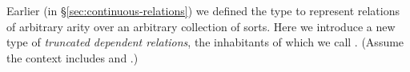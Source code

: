 Earlier (in \S\ref{sec:continuous-relations}) we defined the  type to represent relations of arbitrary arity over an arbitrary collection of sorts. Here we introduce a new type of \emph{truncated dependent relations}, the inhabitants of which we call . (Assume the context includes \AgdaSpace{}%
\AgdaSymbol{:}\AgdaSpace{}%
 and \AgdaSpace{}%
\AgdaSymbol{:}\AgdaSpace{}%
\AgdaSpace{}%
.)
\ccpad
\begin{code}%
\>[0][@{}l@{\AgdaIndent{1}}]%
\>[1]\AgdaSpace{}%
\AgdaSymbol{:}\AgdaSpace{}%
\AgdaSymbol{\{}\AgdaSpace{}%
\AgdaSymbol{:}\AgdaSpace{}%
\AgdaSpace{}%
\AgdaSymbol{\}\{}\AgdaSpace{}%
\AgdaSymbol{:}\AgdaSpace{}%
\AgdaSpace{}%
\AgdaSpace{}%
\AgdaSpace{}%
\AgdaSymbol{\}\{}\AgdaSpace{}%
\AgdaSymbol{:}\AgdaSpace{}%
\AgdaSymbol{\}}\AgdaSpace{}%
\AgdaSpace{}%
\AgdaSpace{}%
\AgdaSpace{}%
\AgdaSpace{}%
%
\>[66]\AgdaSpace{}%
\AgdaSpace{}%
\AgdaSpace{}%
\AgdaSpace{}%
\AgdaSpace{}%
\AgdaSpace{}%
\<%
\\
%
\>[1]\AgdaSpace{}%
\AgdaSymbol{\{}\AgdaSpace{}%
\AgdaSymbol{=}\AgdaSpace{}%
\AgdaSymbol{\}}\AgdaSpace{}%
\AgdaSymbol{\{}\AgdaSymbol{\}}\AgdaSpace{}%
\AgdaSpace{}%
\AgdaSymbol{=}\AgdaSpace{}%
\AgdaSpace{}%
\AgdaSpace{}%
\AgdaSpace{}%
\AgdaSpace{}%
\AgdaSpace{}%
\AgdaFunction{,}\AgdaSpace{}%
\AgdaSpace{}%
\AgdaSymbol{(}\AgdaSpace{}%
\AgdaSymbol{)}\<%
\\
%
\\[\AgdaEmptyExtraSkip]%
%
\>[1]\AgdaSpace{}%
\AgdaSymbol{:}\AgdaSpace{}%
\AgdaSymbol{(}\AgdaSpace{}%
\AgdaSpace{}%
\AgdaSpace{}%
\AgdaSymbol{)}\AgdaSpace{}%
\AgdaSpace{}%
\AgdaSymbol{(}\AgdaSpace{}%
\AgdaSymbol{:}\AgdaSpace{}%
\AgdaSymbol{)}\AgdaSpace{}%
\AgdaSpace{}%

\end{code}
